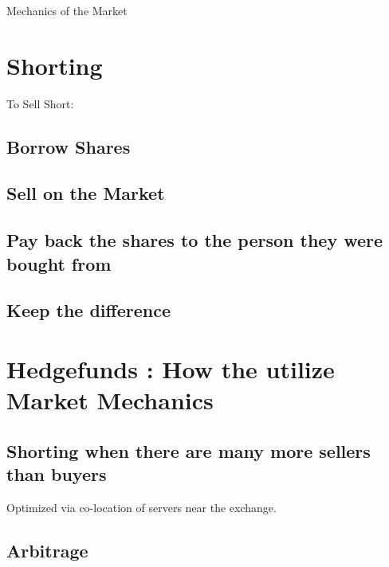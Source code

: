 \documentclass{article}
\begin{document}
\centerline{\Large Mechanics of the Market}
\section{Shorting}
To Sell Short:
\subsection{Borrow Shares}
\subsection{Sell on the Market}
\subsection{Pay back the shares to the person they were bought from}
\subsection{Keep the difference}
\section{Hedgefunds : How the utilize Market Mechanics}
\subsection{
Shorting when there are many more sellers than buyers}
Optimized via co-location of servers near the exchange.
\subsection{Arbitrage}
\end{document}
